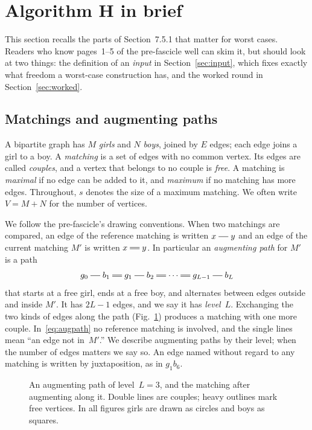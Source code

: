 \section{Algorithm H in brief}
\label{sec:background}

This section recalls the parts of Section~7.5.1 that matter for worst
cases. Readers who know pages~1--5 of the pre-fascicle well can skim it,
but should look at two things: the definition of an \emph{input} in
Section~\ref{sec:input}, which fixes exactly what freedom a worst-case
construction has, and the worked round in Section~\ref{sec:worked}.

\subsection{Matchings and augmenting paths}

A bipartite graph has $M$ \emph{girls} and $N$ \emph{boys}, joined by $E$
edges; each edge joins a girl to a boy. A \emph{matching} is a set of
edges with no common vertex. Its edges are called \emph{couples}, and a
vertex that belongs to no couple is \emph{free}. A matching is
\emph{maximal} if no edge can be added to it, and \emph{maximum} if no
matching has more edges. Throughout, $s$ denotes the size of a maximum
matching. We often write $V=M+N$ for the number of vertices.

We follow the pre-fascicle's drawing conventions. When two matchings are
compared, an edge of the reference matching is written $x\sg y$ and an
edge of the current matching $M'$ is written $x\db y$. In particular an
\emph{augmenting path} for $M'$ is a path
\begin{equation}
  g_0\sg b_1\db g_1\sg b_2\db\cdots\db g_{L-1}\sg b_L
  \label{eq:augpath}
\end{equation}
that starts at a free girl, ends at a free boy, and alternates between
edges outside and inside $M'$. It has $2L-1$ edges, and we say it has
\emph{level}~$L$. Exchanging the two kinds of edges along the path
(Fig.~\ref{fig:augpath}) produces a matching with one more couple.
In~\eqref{eq:augpath} no reference matching is involved, and the single
lines mean ``an edge not in~$M'$.'' We describe augmenting paths by
their level; when the number of edges matters we say so. An edge named
without regard to any matching is written by juxtaposition, as in
$g_1b_6$.

\begin{figure}[ht]
\centering

\caption{An augmenting path of level~$L=3$, and the matching after
augmenting along it. Double lines are couples; heavy outlines mark free
vertices. In all figures girls are drawn as circles and boys as squares.}
\label{fig:augpath}
\end{figure}

